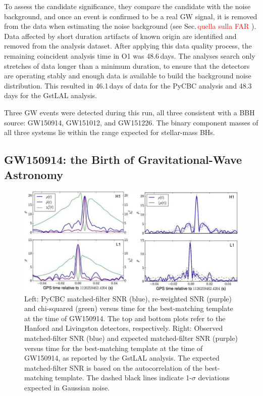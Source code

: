 \documentclass[binding=0.6cm, LaM]{sapthesis}
\newcommand{\fpg}[1]{\textcolor{red}{#1} }
\begin{document}
	To assess the candidate significance, they compare the candidate with the noise background, 
	and once an event is confirmed to be a real GW signal, it is removed from the data when estimating the noise background (see Sec.\,\fpg{quella sulla FAR}).
	Data affected by short duration artifacts of known origin are identified and removed from the analysis dataset.
	After applying this data quality process, the remaining coincident analysis time in O1 was 48.6\,days. 
	The analyses search only stretches of data longer than a minimum duration, 
	to ensure that the detectors are operating stably and enough data is available to build the background noise distribution.  This 
	resulted in 46.1\,days of data for the PyCBC analysis and 48.3\,days for the GstLAL analysis.

	Three GW events were detected during this run, all three consistent with a BBH source: GW150914, GW151012, and GW151226.
	The binary component masses of all three systems lie 
	within the range expected for stellar-mass BHs. 

\subsection{GW150914: the Birth of Gravitational-Wave Astronomy}

		\begin{figure}[!t]
                	\label{firstgw}
                	\includegraphics[scale=0.45]{firstgw}
                	\centering
                	\caption{Left: PyCBC matched-filter SNR (blue), re-weighted SNR (purple) and chi-squared (green) versus time for the best-matching template at the time of GW150914. The top and bottom plots refer to the Hanford and Livingston detectors, respectively. Right: Observed matched-filter SNR (blue) and expected matched-filter SNR (purple) versus time for the best-matching template at the time of GW150914, as reported by the GstLAL analysis. The expected matched-filter SNR is based on the autocorrelation of the best-matching template. The dashed black lines indicate 1-$\sigma$ deviations expected in Gaussian noise. \cite{21}} 
                	\label{fig:firstgw}
                \end{figure}
\end{document}
